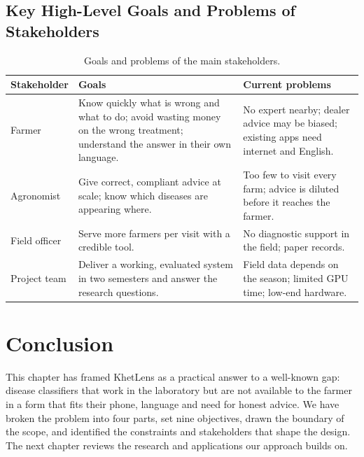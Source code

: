 \subsection{Key High-Level Goals and Problems of Stakeholders}
\begin{table}[H]
\centering\small
\caption{Goals and problems of the main stakeholders.}
\label{tab:stakeholder-goals}
\begin{tabularx}{\textwidth}{|L{3.0cm}|Y|Y|}
\hline
\textbf{Stakeholder} & \textbf{Goals} & \textbf{Current problems} \\ \hline
Farmer & Know quickly what is wrong and what to do; avoid wasting money on the wrong treatment; understand the answer in their own language. & No expert nearby; dealer advice may be biased; existing apps need internet and English. \\ \hline
Agronomist & Give correct, compliant advice at scale; know which diseases are appearing where. & Too few to visit every farm; advice is diluted before it reaches the farmer. \\ \hline
Field officer & Serve more farmers per visit with a credible tool. & No diagnostic support in the field; paper records. \\ \hline
Project team & Deliver a working, evaluated system in two semesters and answer the research questions. & Field data depends on the season; limited GPU time; low-end hardware. \\ \hline
\end{tabularx}
\end{table}

\section{Conclusion}
This chapter has framed KhetLens as a practical answer to a well-known gap: disease classifiers that work in the laboratory but are not available to the farmer in a form that fits their phone, language and need for honest advice. We have broken the problem into four parts, set nine objectives, drawn the boundary of the scope, and identified the constraints and stakeholders that shape the design. The next chapter reviews the research and applications our approach builds on.
